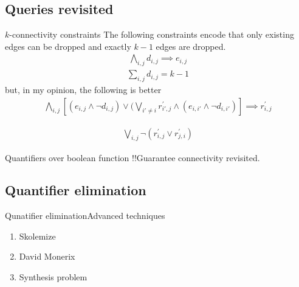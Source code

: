 \documentclass{beamer}
\begin{document}
    \subsection{Queries revisited}
    \begin{frame}[label=math]{$k$-connectivity constraints}
    The following constraints encode that only
existing edges can be dropped and exactly $k-1$ edges are dropped.
     \begin{equation}
\begin{alignedat}{2}
\ \bigwedge\limits_{i,j} d_{i,j} \implies e_{i,j}\\
  \sum_{i,j} d_{i,j} = k-1
\end{alignedat}
\end{equation}
but, in my opinion, the following is better
\begin{equation}
\begin{alignedat}{2}
\bigwedge\limits_{i,j}  [(e_{i,j} \land  \neg d_{i,j}) \lor  (\bigvee_{i' \neq i}  r^{\prime}_{i',j} \land  (e_{i,i'} \land \neg d_{i,i'}) ] \implies r^{\prime}_{i,j}  
\end{alignedat}
\end{equation}

 \begin{equation}
\begin{alignedat}{2}
 \bigvee\limits_{i,j} \neg (r^{\prime}_{i,j} \lor r^{\prime}_{j,i})
\end{alignedat}
\end{equation}
\end{frame}
  
  

    \begin{frame}{Quantifiers over boolean function !!}{Guarantee connectivity revisited.}
      \sleepSort
    \end{frame}
    
    \subsection{Quantifier elimination}
\begin{frame}{Qunatifier elimination}{Advanced techniques}
\begin{enumerate}
\item Skolemize
\item David Monerix
\item Synthesis problem
\end{enumerate}
\end{frame}
\end{document}
